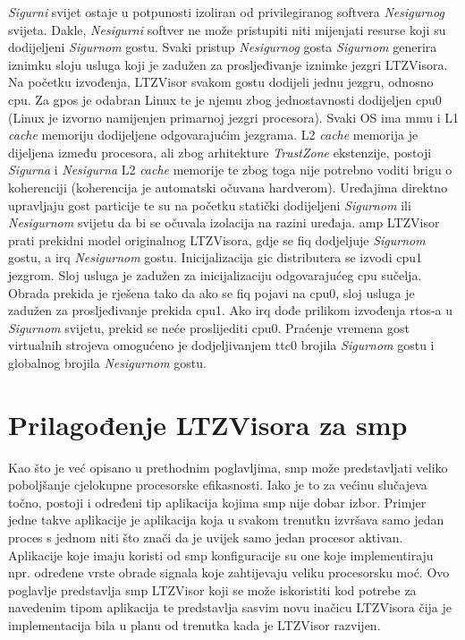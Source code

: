 \documentclass[times, utf8, diplomski, numeric]{fer}
\begin{document}
\textit{Sigurni} svijet ostaje u potpunosti izoliran od privilegiranog softvera \textit{Nesigurnog} svijeta. Dakle,
\textit{Nesigurni} softver ne može pristupiti niti mijenjati resurse koji su dodijeljeni \textit{Sigurnom} gostu. Svaki pristup
\textit{Nesigurnog} gosta \textit{Sigurnom} generira iznimku sloju usluga koji je zadužen za prosljeđivanje iznimke jezgri
LTZVisora.\\
Na početku izvođenja, LTZVisor svakom gostu dodijeli jednu jezgru, odnosno \gls{cpu}. Za \gls{gpos} je odabran Linux te je njemu
zbog jednostavnosti dodijeljen \gls{cpu}0 (Linux je izvorno namijenjen primarnoj jezgri procesora). Svaki OS ima \gls{mmu} i L1
\textit{cache} memoriju dodijeljene odgovarajućim jezgrama. L2 \textit{cache} memorija je dijeljena između procesora, ali zbog
arhitekture \textit{TrustZone} ekstenzije, postoji \textit{Sigurna} i \textit{Nesigurna} L2 \textit{cache} memorije te zbog
toga nije potrebno voditi brigu o koherenciji (koherencija je automatski očuvana hardverom). Uređajima direktno upravljaju gost
particije te su na početku statički dodijeljeni \textit{Sigurnom} ili \textit{Nesigurnom} svijetu da bi se očuvala izolacija
na razini uređaja. \gls{amp} LTZVisor prati prekidni model originalnog LTZVisora, gdje se \gls{fiq} dodjeljuje \textit{Sigurnom} gostu,
a \gls{irq} \textit{Nesigurnom} gostu. Inicijalizacija \gls{gic} distributera se izvodi \gls{cpu}1 jezgrom. Sloj usluga je zadužen za
inicijalizaciju odgovarajućeg \gls{cpu} sučelja. Obrada prekida je rješena tako da ako se \gls{fiq} pojavi na \gls{cpu}0, sloj usluga je zadužen
za prosljeđivanje prekida \gls{cpu}1. Ako \gls{irq} dođe prilikom izvođenja \gls{rtos}-a u \textit{Sigurnom} svijetu, prekid se neće proslijediti
\gls{cpu}0. Praćenje vremena gost virtualnih strojeva omogućeno je dodjeljivanjem \gls{ttc}0 brojila \textit{Sigurnom} gostu i globalnog
brojila \textit{Nesigurnom} gostu.

\section{Prilagođenje LTZVisora za \gls{smp}}
Kao što je već opisano u prethodnim poglavljima, \gls{smp} može predstavljati veliko poboljšanje cjelokupne procesorske efikasnosti.
Iako je to za većinu slučajeva točno, postoji i određeni tip aplikacija kojima \gls{smp} nije dobar izbor. Primjer jedne takve
aplikacije je aplikacija koja u svakom trenutku izvršava samo jedan proces s jednom niti što znači da je uvijek samo jedan procesor aktivan.
Aplikacije koje imaju koristi od \gls{smp} konfiguracije su one koje implementiraju npr. određene vrste obrade signala koje
zahtijevaju veliku procesorsku moć. Ovo poglavlje predstavlja \gls{smp} LTZVisor koji se može iskoristiti kod potrebe za navedenim
tipom aplikacija te predstavlja sasvim novu inačicu LTZVisora čija je implementacija bila u planu od trenutka kada je LTZVisor
razvijen.
\end{document}
